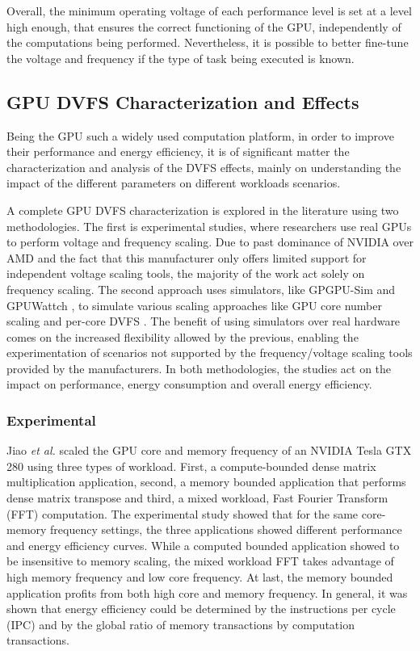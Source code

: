 Overall, the minimum operating voltage of each performance level is set at a level high enough, that ensures the correct functioning of the GPU, independently of the computations being performed. Nevertheless, it is possible to better fine-tune the voltage and frequency if the type of task being executed is known.

\subsection{GPU DVFS Characterization and Effects}

Being the GPU such a widely used computation platform, in order to improve their performance and energy efficiency, it is of significant matter the characterization and analysis of the DVFS effects, mainly on understanding the impact of the different parameters on different workloads scenarios. 

A complete GPU DVFS characterization is explored in the literature using two methodologies. The first is experimental studies, where researchers use real GPUs to perform voltage and frequency scaling. Due to past dominance of NVIDIA over AMD \cite{noauthor_jon_2018} \cite{mujtaba_amd_2019} and the fact that this manufacturer only offers limited support for independent voltage scaling tools, the majority of the work act solely on frequency scaling. The second approach uses simulators, like GPGPU-Sim \cite{noauthor_gpgpu-sim/gpgpu-sim_distribution_2019} and GPUWattch \cite{noauthor_gpu_2011} \cite{leng_gpuwattch:_2013},  to simulate various scaling approaches like GPU core number scaling and per-core DVFS \cite{mei_survey_2016}. The benefit of using simulators over real hardware comes on the increased flexibility allowed by the previous, enabling the experimentation of scenarios not supported by the frequency/voltage scaling tools provided by the manufacturers. In both methodologies, the studies act on the impact on performance, energy consumption and overall energy efficiency.

\subsubsection{Experimental}

Jiao \textit{et al.} \cite{jiao_power_2010} scaled the GPU core and memory frequency of an NVIDIA Tesla GTX 280 using three types of workload. First, a compute-bounded dense matrix multiplication application, second, a memory bounded application that performs dense matrix transpose and third, a mixed workload, Fast Fourier Transform (FFT) computation. The experimental study showed that for the same core-memory frequency settings, the three applications showed different performance and energy efficiency curves. While a computed bounded application showed to be insensitive to memory scaling, the mixed workload FFT takes advantage of high memory frequency and low core frequency. At last, the memory bounded application profits from both high core and memory frequency. In general, it was shown that energy efficiency could be determined by the instructions per cycle (IPC) and by the global ratio of memory transactions by computation transactions.

